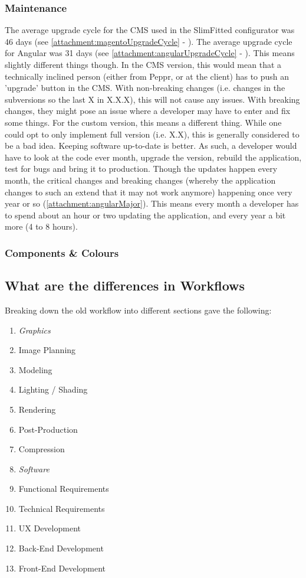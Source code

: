 \subsubsection{Maintenance}
The average upgrade cycle for the CMS used in the SlimFitted configurator was 46 days (see \ref{attachment:magentoUpgradeCycle} - \cite{magentoReleaseHistory}). The average upgrade cycle for Angular was 31 days (see \ref{attachment:angularUpgradeCycle} - \cite{angularReleaseHistory}). This means slightly different things though. In the CMS version, this would mean that a technically inclined person (either from Peppr, or at the client) has to push an 'upgrade' button in the CMS. With non-breaking changes (i.e. changes in the subversions so the last X in X.X.X), this will not cause any issues. With breaking changes, they might pose an issue where a developer may have to enter and fix some things.\newline
For the custom version, this means a different thing. While one could opt to only implement full version (i.e. X.X), this is generally considered to be a bad idea. Keeping software up-to-date is better. As such, a developer would have to look at the code ever month, upgrade the version, rebuild the application, test for bugs and bring it to production. Though the updates happen every month, the critical changes and breaking changes (whereby the application changes to such an extend that it may not work anymore) happening once very year or so (\ref{attachment:angularMajor}). This means every month a developer has to spend about an hour or two updating the application, and every year a bit more (4 to 8 hours).


\subsubsection{Components \& Colours}

\subsection {What are the differences in Workflows}
\label{subsub:differencesInWorkflow}
Breaking down the old workflow into different sections gave the following:
\begin{enumerate}
	\item {\textit{Graphics}}
	\item {Image Planning}
	\item {Modeling}
	\item {Lighting / Shading}
	\item {Rendering}
	\item {Post-Production}
	\item {Compression}
	\item {\textit{Software}}
	\item {Functional Requirements}
	\item {Technical Requirements}
	\item {UX Development}
	\item {Back-End Development}
	\item {Front-End Development}
\end{enumerate}

